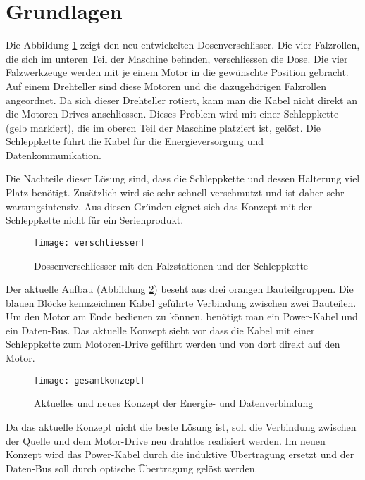 \section{Grundlagen}\label{sec:Grundlagen}

Die Abbildung \ref{fig:verschliesser} zeigt den neu entwickelten Dosenverschlisser. Die vier Falzrollen, die sich im unteren Teil der Maschine befinden, verschliessen die Dose. Die vier Falzwerkzeuge werden mit je einem Motor in die gewünschte Position gebracht. Auf einem Drehteller sind diese Motoren und die dazugehörigen Falzrollen angeordnet. Da sich dieser Drehteller rotiert, kann man die Kabel nicht direkt an die Motoren-Drives anschliessen. Dieses Problem wird mit einer Schleppkette (gelb markiert), die im oberen Teil der Maschine platziert ist, gelöst. Die Schleppkette führt die Kabel für die Energieversorgung und Datenkommunikation.

Die Nachteile dieser Lösung sind, dass die Schleppkette und dessen Halterung viel Platz benötigt. Zusätzlich wird sie sehr schnell verschmutzt und ist daher sehr wartungsintensiv. Aus diesen Gründen eignet sich das Konzept mit der Schleppkette nicht für ein Serienprodukt.  

\begin{figure}[H]
	\centering
	\texttt{[image: verschliesser]}
	\caption{Dossenverschliesser mit den Falzstationen und der Schleppkette}\label{fig:verschliesser}
\end{figure}

Der aktuelle Aufbau (Abbildung \ref{fig:gesamtkonzept}) beseht aus drei orangen Bauteilgruppen. Die blauen Blöcke kennzeichnen Kabel geführte Verbindung zwischen zwei Bauteilen. Um den Motor am Ende bedienen zu können, benötigt man ein Power-Kabel und ein Daten-Bus. Das aktuelle Konzept sieht vor dass die Kabel mit einer Schleppkette zum Motoren-Drive geführt werden und von dort direkt auf den Motor. 

\begin{figure}[H]
	\centering
	\texttt{[image: gesamtkonzept]}
	\caption{Aktuelles und neues Konzept der Energie- und Datenverbindung}\label{fig:gesamtkonzept}
\end{figure}

Da das aktuelle Konzept nicht die beste Lösung ist, soll die Verbindung zwischen der Quelle und dem Motor-Drive neu drahtlos realisiert werden. Im neuen Konzept wird das Power-Kabel durch die induktive Übertragung ersetzt und der Daten-Bus soll durch optische Übertragung gelöst werden. 

